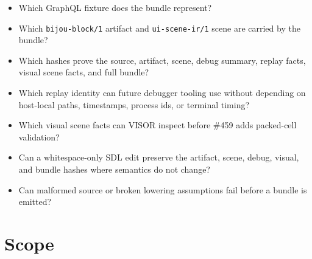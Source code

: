 \begin{itemize}
\tightlist
\item
  Which GraphQL fixture does the bundle represent?
\item
  Which \texttt{b\allowbreak{}i\allowbreak{}j\allowbreak{}o\allowbreak{}u\allowbreak{}-\allowbreak{}b\allowbreak{}l\allowbreak{}o\allowbreak{}c\allowbreak{}k\allowbreak{}/\allowbreak{}1} artifact and \texttt{u\allowbreak{}i\allowbreak{}-\allowbreak{}s\allowbreak{}c\allowbreak{}e\allowbreak{}n\allowbreak{}e\allowbreak{}-\allowbreak{}i\allowbreak{}r\allowbreak{}/\allowbreak{}1} scene are carried by the bundle?
\item
  Which hashes prove the source, artifact, scene, debug summary, replay facts, visual scene facts, and full bundle?
\item
  Which replay identity can future debugger tooling use without depending on host-local paths, timestamps, process ids, or terminal timing?
\item
  Which visual scene facts can VISOR inspect before \#459 adds packed-cell validation?
\item
  Can a whitespace-only SDL edit preserve the artifact, scene, debug, visual, and bundle hashes where semantics do not change?
\item
  Can malformed source or broken lowering assumptions fail before a bundle is emitted?
\end{itemize}

\section{Scope}\label{record-145-scope}

